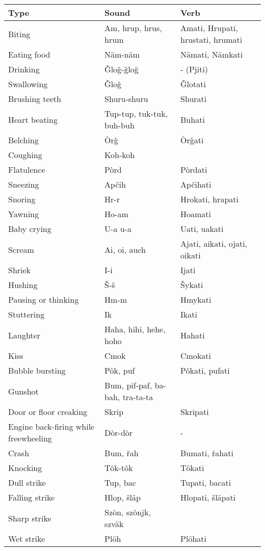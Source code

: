 \begin{longtable}{p{10em}p{5em}p{5em}}
		\textbf{Type} & \textbf{Sound} & \textbf{Verb} \\
		\endhead
		Biting & Am, hrup, hrus, hrum & Amati, Hrupati, hrustati, hrumati \\
		Eating food & Näm-näm & Nämati, Nämkati \\
		Drinking & Ǧloǧ-ǧloǧ & - (Pjiti) \\
		Swallowing & Ǧloǧ & Ǧlotati \\
		Brushing teeth & Shuru-shuru & Shurati \\
		Heart beating & Tup-tup, tuk-tuk, buh-buh & Buhati \\
		Belching & Òrǧ & Òrǧati \\
		Coughing & Koh-koh & \\
		Flatulence & Pòrd & Pòrdati \\
		Sneezing & Apčih & Apčihati \\
		Snoring & Hr-r & Hrokati, hrapati \\
		Yawning & Ho-am & Hoamati \\
		Baby crying & U-a u-a & Uati, uakati \\
		Scream & Ai, oi, auch & Ajati, aikati, ojati, oikati \\
		Shriek & I-i & Ijati \\
		Hushing & Š-š & Šykati \\
		Pausing or thinking & Hm-m & Hmykati \\
		Stuttering & Ik & Ikati \\
		Laughter & Haha, hihi, hehe, hoho & Hahati \\
		Kiss & Cmok & Cmokati \\
		Bubble bursting & Pôk, puf & Pôkati, pufati \\
		Gunshot & Bum, pif-paf, ba-bah, tra-ta-ta & \\
		Door or floor creaking & Skrip & Skripati \\
		Engine back-firing while freewheeling & Dòr-dòr & - \\
		Crash & Bum, řah & Bumati, řahati \\
		Knocking & Tôk-tôk & Tôkati \\ 
		Dull strike & Tup, bac & Tupati, bacati \\
		Falling strike & Hlop, šläp & Hlopati, šläpati \\
		Sharp strike & Szòn, szònjk, szväk & \\
		Wet strike & Plöh & Plöhati \\

\end{longtable}
